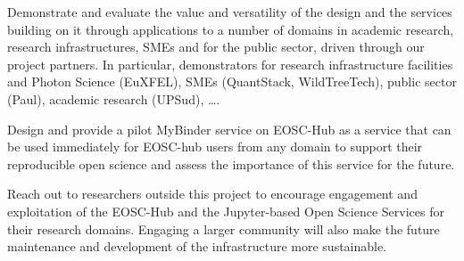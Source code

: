 \begin{compactenum}
\item \label{aim:demonstrators}%
  Demonstrate and evaluate the value and versatility of the design and
  the services building on it through applications to a number of
  domains in academic research, research infrastructures, SMEs and for
  the public sector, driven through our project partners. In
  particular, demonstrators for research infrastructure facilities and
  Photon Science (EuXFEL), SMEs (QuantStack, WildTreeTech), public
  sector (Paul), academic research (UPSud), \ldots.


\item \label{aim:binderservice}%
  Design and provide a pilot MyBinder service on EOSC-Hub as a service
  that can be used immediately for EOSC-hub users from any domain to
  support their reproducible open science and assess the importance of
  this service for the future.

\item \label{aim:outreach-and-engagement}%
  Reach out to researchers outside this project to encourage engagement
  and exploitation of the EOSC-Hub and the Jupyter-based Open Science
  Services for their research domains.
  Engaging a larger community will also make the
  future maintenance and development of the infrastructure more sustainable.

\end{compactenum}


